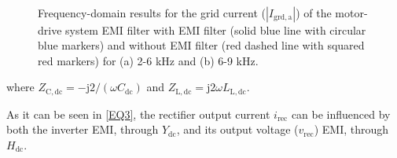 \documentclass[journal,a4paper,10pt,twoside]{IEEEtran} %
\begin{document}
		\begin{figure}[h!]
			    \centering
			    \\ \vspace{-3mm}
			    \caption{Frequency-domain results for the  grid current ($|I_\mathrm{grd,a}|$) of the motor-drive system EMI filter with EMI filter (solid blue line with circular blue markers) and without EMI filter (red dashed line with squared red markers) for (a) 2-6 kHz and (b) 6-9 kHz.} 
			    \label{FIG5}
	    \end{figure}
		
		\noindent where $Z_{\mathrm{C,dc}}=-\mathrm{j}2/\left(\omega C_{\mathrm{dc}}\right)$ and $Z_{\mathrm{L,dc}}=\mathrm{j}2\omega L_\mathrm{L,dc}$.
		
		{\color{red} As it can be seen in \eqref{EQ3}, the rectifier output current $i_\mathrm{rec}$ can be influenced by both the inverter EMI, through $Y_{\mathrm{dc}}$, and its output voltage ($v_\mathrm{rec}$) EMI, through $H_\mathrm{dc}$.}
		
\end{document}
